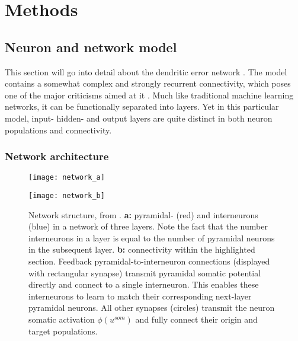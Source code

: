 
\chapter{Methods}




\section{Neuron and network model}

This section will go into detail about the dendritic error network \citep{sacramento2018dendritic}. The model contains a
somewhat complex and strongly recurrent connectivity, which poses one of the major criticisms aimed at it
\citep{whittington2019theories}. Much like traditional machine learning networks, it can be functionally separated into
layers. Yet in this particular model, input- hidden- and output layers are quite distinct in both neuron populations and
connectivity.


\subsection{Network architecture}

\begin{figure}[t]
  \centering
  \begin{minipage}{0.5\textwidth}
    \centering
    \texttt{[image: network\_a]}
  \end{minipage}\hfill
  \begin{minipage}{0.4\textwidth}
    \centering
    \texttt{[image: network\_b]}
  \end{minipage}
  \caption{Network structure, from \cite{Haider2021}. \textbf{a:} pyramidal- (red) and interneurons (blue) in a network
    of three layers. Note the fact that the number interneurons in a layer is equal to the number of pyramidal neurons
    in the subsequent layer\protect\footnotemark. \textbf{b:} connectivity within the highlighted section. Feedback
    pyramidal-to-interneuron connections (displayed with rectangular synapse) transmit pyramidal somatic potential
    directly and connect to a single interneuron. This enables these interneurons to learn to match their corresponding
    next-layer pyramidal neurons. All other synapses (circles) transmit the neuron somatic activation $\phi (u^{som})$
    and fully connect their origin and target populations.}
  \label{fig-network}
\end{figure}

